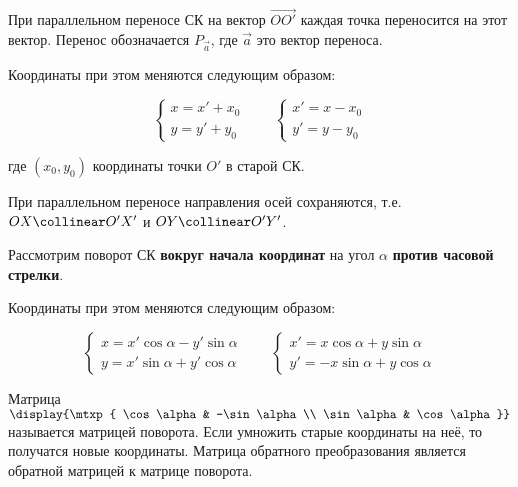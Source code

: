 
При параллельном переносе СК на вектор \(\vec{OO'}\) каждая точка переносится на
этот вектор. Перенос обозначается \(P_{\vec{a}}\), где \(\vec{a}\) это вектор
переноса.  

Координаты при этом меняются следующим образом:

\begin{equation*}
  \begin{cases}
    x = x' + x_0 \\
    y = y' + y_0
  \end{cases}
  \qquad
  \begin{cases}
    x' = x - x_0 \\
    y' = y - y_0
  \end{cases} 
\end{equation*}

где \((x_0, y_0)\) координаты точки \(O'\) в старой СК.

\begin{remark}
  При параллельном переносе направления осей сохраняются, т.е.
  \(OX \collinear O'X'\) и \(OY \collinear  O'Y'\).
\end{remark}


Рассмотрим поворот СК \textbf{вокруг начала координат} на угол \(\alpha\)
\textbf{против часовой стрелки}.

Координаты при этом меняются следующим образом:

\begin{equation*} \label{eq:CS-rotate} \tag{ROT}
  \begin{cases}
    x = x' \cos \alpha - y' \sin \alpha \\
    y = x' \sin \alpha + y' \cos \alpha
  \end{cases}
  \qquad
  \begin{cases}
    x' = x \cos \alpha + y \sin \alpha \\
    y' = -x \sin \alpha + y \cos \alpha
  \end{cases}
\end{equation*}

\begin{remark}
  Матрица \(\display{\mtxp{
    \cos \alpha & -\sin \alpha \\
    \sin \alpha & \cos \alpha
  }}\)  называется матрицей поворота. Если умножить старые координаты на неё, то
  получатся новые координаты. Матрица обратного преобразования является обратной
  матрицей к матрице поворота. 
\end{remark}

